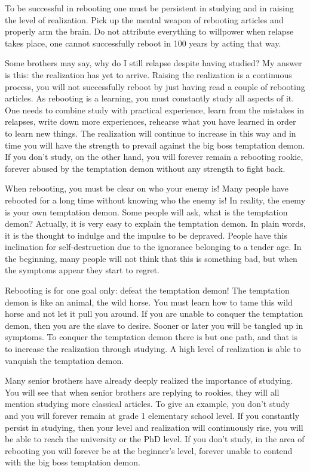 \documentclass[
]{book}
\begin{document}
To be successful in rebooting one must be persistent in studying and in raising the level of realization. Pick up the mental weapon of rebooting articles and properly arm the brain. Do not attribute everything to willpower when relapse takes place, one cannot successfully reboot in 100 years by acting that way.

Some brothers may say, why do I still relapse despite having studied? My answer is this: the realization has yet to arrive. Raising the realization is a continuous process, you will not successfully reboot by just having read a couple of rebooting articles. As rebooting is a learning, you must constantly study all aspects of it. One needs to combine study with practical experience, learn from the mistakes in relapses, write down more experiences, rehearse what you have learned in order to learn new things. The realization will continue to increase in this way and in time you will have the strength to prevail against the big boss temptation demon. If you don't study, on the other hand, you will forever remain a rebooting rookie, forever abused by the temptation demon without any strength to fight back.

When rebooting, you must be clear on who your enemy is! Many people have rebooted for a long time without knowing who the enemy is! In reality, the enemy is your own temptation demon. Some people will ask, what is the temptation demon? Actually, it is very easy to explain the temptation demon. In plain words, it is the thought to indulge and the impulse to be depraved. People have this inclination for self-destruction due to the ignorance belonging to a tender age. In the beginning, many people will not think that this is something bad, but when the symptoms appear they start to regret.

Rebooting is for one goal only: defeat the temptation demon! The temptation demon is like an animal, the wild horse. You must learn how to tame this wild horse and not let it pull you around. If you are unable to conquer the temptation demon, then you are the slave to desire. Sooner or later you will be tangled up in symptoms. To conquer the temptation demon there is but one path, and that is to increase the realization through studying. A high level of realization is able to vanquish the temptation demon.

Many senior brothers have already deeply realized the importance of studying. You will see that when senior brothers are replying to rookies, they will all mention studying more classical articles. To give an example, you don't study and you will forever remain at grade 1 elementary school level. If you constantly persist in studying, then your level and realization will continuously rise, you will be able to reach the university or the PhD level. If you don't study, in the area of rebooting you will forever be at the beginner's level, forever unable to contend with the big boss temptation demon.
\end{document}
